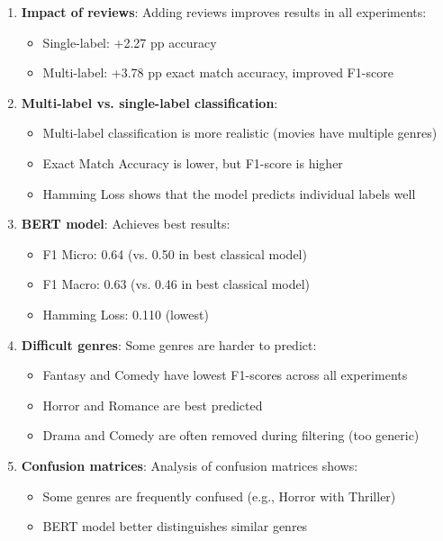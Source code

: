 \documentclass[12pt,a4paper]{article}
\begin{document}
\begin{enumerate}
    \item \textbf{Impact of reviews}: Adding reviews improves results in all experiments:
    \begin{itemize}
        \item Single-label: +2.27 pp accuracy
        \item Multi-label: +3.78 pp exact match accuracy, improved F1-score
    \end{itemize}
    
    \item \textbf{Multi-label vs. single-label classification}: 
    \begin{itemize}
        \item Multi-label classification is more realistic (movies have multiple genres)
        \item Exact Match Accuracy is lower, but F1-score is higher
        \item Hamming Loss shows that the model predicts individual labels well
    \end{itemize}
    
    \item \textbf{BERT model}: Achieves best results:
    \begin{itemize}
        \item F1 Micro: 0.64 (vs. 0.50 in best classical model)
        \item F1 Macro: 0.63 (vs. 0.46 in best classical model)
        \item Hamming Loss: 0.110 (lowest)
    \end{itemize}
    
    \item \textbf{Difficult genres}: Some genres are harder to predict:
    \begin{itemize}
        \item Fantasy and Comedy have lowest F1-scores across all experiments
        \item Horror and Romance are best predicted
        \item Drama and Comedy are often removed during filtering (too generic)
    \end{itemize}
    
    \item \textbf{Confusion matrices}: Analysis of confusion matrices shows:
    \begin{itemize}
        \item Some genres are frequently confused (e.g., Horror with Thriller)
        \item BERT model better distinguishes similar genres
    \end{itemize}
\end{enumerate}
\end{document}
